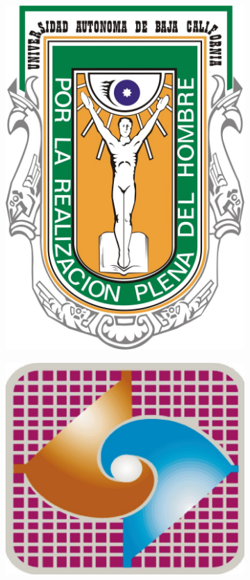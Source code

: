 \documentclass{article}
\begin{document}
\begin{titlepage}
\begin{figure}[h]
\begin{subfigure}{0.5\textwidth}
\centering
\includegraphics[scale=0.1]{uabc.png}
\end{subfigure}
\begin{subfigure}{0.5\textwidth}
\centering
\includegraphics[scale=0.1]{fcs.jpg}
\end{subfigure}
\end{figure}
\end{titlepage}
\end{document}

